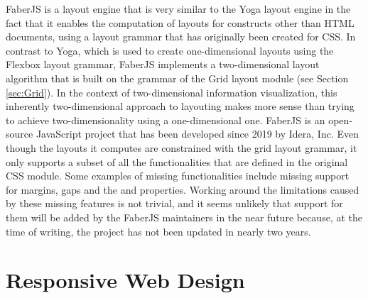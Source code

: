 FaberJS \parencite{FaberJS} is a layout engine that is very similar to the Yoga layout engine in the fact that it enables the computation of layouts for constructs other than HTML documents, using a layout grammar that has originally been created for CSS. 
In contrast to Yoga, which is used to create one-dimensional layouts using the Flexbox layout grammar, FaberJS implements a two-dimensional layout algorithm that is built on the grammar of the Grid layout module (see Section \ref{sec:Grid}). 
In the context of two-dimensional information visualization, this inherently two-dimensional approach to layouting makes more sense than trying to achieve two-dimensionality using a one-dimensional one. 
FaberJS is an open-source JavaScript project that has been developed since 2019 by Idera, Inc.
Even though the layouts it computes are constrained with the grid layout grammar, it only supports a subset of all the functionalities that are defined in the original CSS module. 
Some examples of missing functionalities include missing support for margins, gaps and the  and  properties. 
Working around the limitations caused by these missing features is not trivial, and it seems unlikely that support for them will be added by the FaberJS maintainers in the near future because, at the time of writing, the project has not been updated in nearly two years. 

\section{Responsive Web Design}
\label{sec:RWD}

